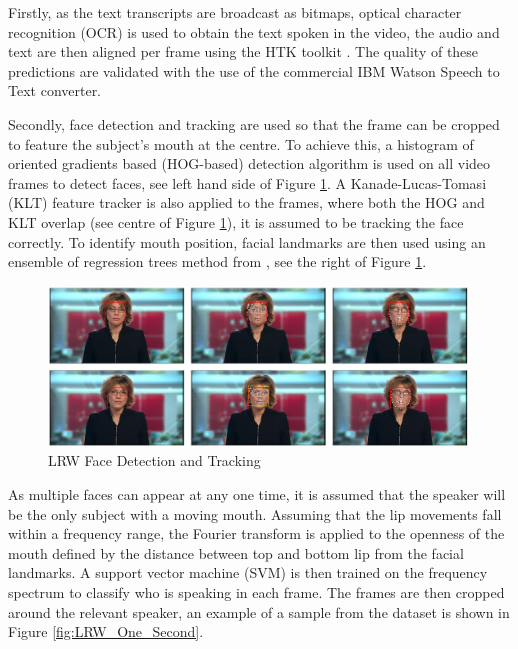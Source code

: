 Firstly, as the text transcripts are broadcast as bitmaps, optical character recognition (OCR) \cite{Buehler2009} is used to obtain the text spoken in the video, the audio and text are then aligned per frame using the HTK toolkit \cite{Woodland1995}.
The quality of these predictions are validated with the use of the commercial IBM Watson Speech to Text converter.

Secondly, face detection and tracking are used so that the frame can be cropped to feature the subject's mouth at the centre.
To achieve this, a histogram of oriented gradients based (HOG-based) detection algorithm \cite{King2009} is used on all video frames to detect faces, see left hand side of Figure \ref{fig:LRW_Face_Detection}.
A Kanade-Lucas-Tomasi (KLT) feature tracker is also applied to the frames, where both the HOG and KLT overlap (see centre of Figure \ref{fig:LRW_Face_Detection}), it is assumed to be tracking the face correctly.
To identify mouth position, facial landmarks are then used using an ensemble of regression trees method from \cite{Kazemi2014}, see the right of Figure \ref{fig:LRW_Face_Detection}.

\begin{figure}[h]
    \centering
        \includegraphics[width=0.99\textwidth]{figures/lrw_face_detection.png}
    \caption{LRW Face Detection and Tracking \cite{Chung2016}}\label{fig:LRW_Face_Detection}
\end{figure}

As multiple faces can appear at any one time, it is assumed that the speaker will be the only subject with a moving mouth.
Assuming that the lip movements fall within a frequency range, the Fourier transform is applied to the openness of the mouth defined by the distance between top and bottom lip from the facial landmarks.
A support vector machine (SVM) is then trained on the frequency spectrum to classify who is speaking in each frame.
The frames are then cropped around the relevant speaker, an example of a sample from the dataset is shown in Figure \ref{fig:LRW_One_Second}.

